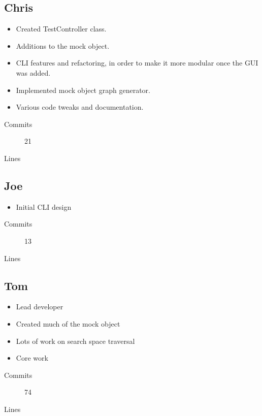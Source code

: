   \subsection{Chris}
    \begin{itemize}
     \item Created TestController class.
     \item Additions to the mock object.
     \item CLI features and refactoring, in order to make it more modular once the GUI was added.
     \item Implemented mock object graph generator.
     \item Various code tweaks and documentation.
    \end{itemize}
    \begin{description}
      \item[Commits] 21
      \item[Lines]
    \end{description}

  \subsection{Joe}
    \begin{itemize}
      \item{Initial CLI design}
    \end{itemize}
    \begin{description}
      \item[Commits] 13
      \item[Lines]
    \end{description}

  \subsection{Tom}
    \begin{itemize}
      \item Lead developer
      \item Created much of the mock object
      \item Lots of work on search space traversal 
      \item Core work
    \end{itemize}
    \begin{description}
      \item[Commits] 74
      \item[Lines]
    \end{description}
